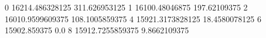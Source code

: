 0 16214.486328125 311.626953125
1 16100.48046875 197.62109375
2 16010.9599609375 108.1005859375
4 15921.3173828125 18.4580078125
6 15902.859375 0.0
8 15912.7255859375 9.8662109375
